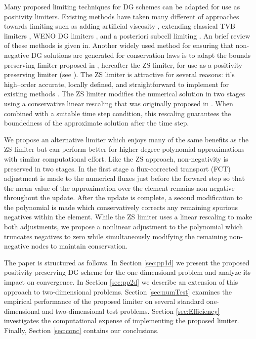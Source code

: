 \documentclass{ametsoc}
\begin{document}
Many proposed limiting techniques for DG schemes can be adapted for use as positivity limiters. Existing methods have taken many different of approaches towards limiting such as adding artificial viscosity \cite{hartmann2002,persson2006}, extending classical TVB limiters \cite{cbShuRKDG-2,cbShuRKDG-3}, WENO DG limiters \cite{qiu-WENODG-1,qiu-WENODG-2,qiu-WENODG-3}, and a posteriori subcell limiting \cite{dumbser2015}. An brief review of these methods is given in\cite{dumbser2015}. Another widely used method for ensuring that non-negative DG solutions are generated for conservation laws is to adapt the bounds preserving limiter proposed in \cite{Zhang2010,Zhang:2011aa}, hereafter the ZS limiter, for use as a positivity preserving limiter (see \cite{Guo:2013aa,Rossmanith:2011aa,Qiu:2011aa}). The ZS limiter is attractive for several reasons: it's high--order accurate, locally defined, and straightforward to implement for existing methods \cite{Zhang2010}. The ZS limiter modifies the numerical solution in two stages using a conservative linear rescaling that was originally proposed in \cite{Liu:1996aa}.  When combined with a suitable time step condition, this rescaling guarantees the boundedness of the approximate solution after the time step.

We propose an alternative limiter which enjoys many of the same benefits as the ZS limiter but can perform better for higher degree polynomial approximations with similar computational effort. Like the ZS approach, non-negativity is preserved in two stages. In the first stage a flux-corrected transport (FCT) adjustment is made to the numerical fluxes just before the forward step so that the mean value of the approximation over the element remains non-negative throughout the update. After the update is complete, a second modification to the polynomial is made which conservatively corrects any remaining spurious negatives within the element. While the ZS limiter uses a linear rescaling to make both adjustments, we propose a nonlinear adjustment to the polynomial which truncates negatives to zero while simultaneously modifying the remaining non-negative nodes to maintain conservation. 

The paper is structured as follows. In Section \ref{sec:pp1d} we present the proposed positivity preserving DG scheme for the one-dimensional problem and analyze its impact on convergence. In Section \ref{sec:pp2d} we describe an extension of this approach to two-dimensional problems. Section \ref{sec:numTest} examines the empirical performance of the proposed limiter on several standard one-dimensional and two-dimensional test problems. Section \ref{sec:Efficiency} investigates the computational expense of implementing the proposed limiter. Finally, Section \ref{sec:conc} contains our conclusions.
\end{document}
